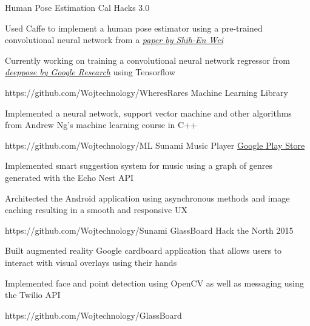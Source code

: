 \begin{cvprojects}
  \cvproject
    {Human Pose Estimation}
    {Cal Hacks 3.0}
    {
      \begin{cvitems}
      \item Used Caffe to implement a human pose estimator using a pre-trained convolutional neural network from a \textit{\href{https://arxiv.org/abs/1602.00134}{paper by Shih-En Wei}}
      \item Currently working on training a convolutional neural network regressor from \textit{\href{http://static.googleusercontent.com/media/research.google.com/ja//pubs/archive/42237.pdf}{deeppose by Google Research}} using Tensorflow
      \end{cvitems}
    }
    {https://github.com/Wojtechnology/WheresRares}
  \cvproject
    {Machine Learning Library}
    {}
    {
      \begin{cvitems}
      \item Implemented a neural network, support vector machine and other algorithms from Andrew Ng's machine learning course in C++
     \end{cvitems}
    }
    {https://github.com/Wojtechnology/ML}
  \cvproject
    {Sunami Music Player}
    {\href{http://play.google.com/store/apps/details?id=com.wojtechnology.sunami}{Google Play Store}}
    {
      \begin{cvitems}
        \item Implemented smart suggestion system for music using a graph of genres generated with the Echo Nest API
        \item Architected the Android application using asynchronous methods and image caching resulting in a smooth and responsive UX
      \end{cvitems}
    }
    {https://github.com/Wojtechnology/Sunami}
  \cvproject
    {GlassBoard}
    {Hack the North 2015}
    {
      \begin{cvitems}
        \item Built augmented reality Google cardboard application that allows users to interact with visual overlays using their hands
        \item Implemented face and point detection using OpenCV as well as messaging using the Twilio API
      \end{cvitems}
    }
    {https://github.com/Wojtechnology/GlassBoard}
\end{cvprojects}
